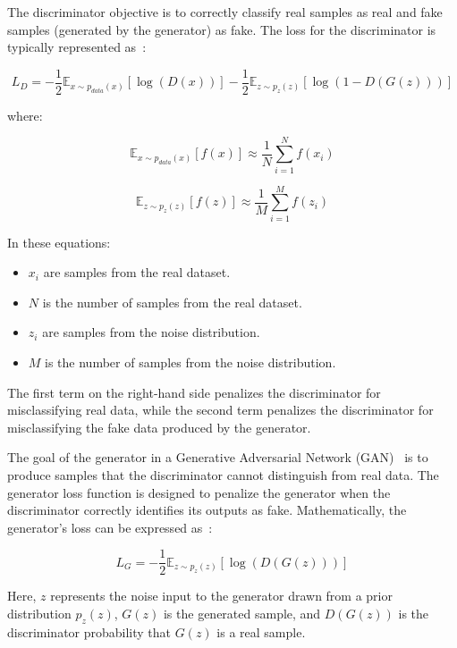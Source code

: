 \documentclass[12pt,a4paper]{report}
\begin{document}
The discriminator objective is to correctly classify real samples as real and fake samples (generated by the generator) as fake. The loss for the discriminator is typically represented as~\cite{gan}:

\begin{equation}
  L_D = - \frac{1}{2} \mathbb{E}_{x \sim p_{data}(x)} [\log(D(x))] - \frac{1}{2} \mathbb{E}_{z \sim p_z(z)} [\log(1 - D(G(z)))]
\end{equation}

where:

\begin{equation}
  \mathbb{E}_{x \sim p_{data}(x)} [f(x)] \approx \frac{1}{N} \sum_{i=1}^{N} f(x_i)
\end{equation}

\begin{equation}
  \mathbb{E}_{z \sim p_z(z)} [f(z)] \approx \frac{1}{M} \sum_{i=1}^{M} f(z_i)
\end{equation}

In these equations:
\begin{itemize}
  \item \( x_i \) are samples from the real dataset.
  \item \( N \) is the number of samples from the real dataset.
  \item \( z_i \) are samples from the noise distribution.
  \item \( M \) is the number of samples from the noise distribution.
\end{itemize}

The first term on the right-hand side penalizes the discriminator for misclassifying real data, while the second term penalizes the discriminator for misclassifying the fake data produced by the generator.

The goal of the generator in a Generative Adversarial Network (GAN)~\cite{goodfellow2014generative} is to produce samples that the discriminator cannot distinguish from real data. The generator loss function is designed to penalize the generator when the discriminator correctly identifies its outputs as fake. Mathematically, the generator's loss can be expressed as~\cite{gan}:

\begin{equation}
  L_G = -\frac{1}{2} \mathbb{E}_{z \sim p_z(z)} \left[ \log(D(G(z))) \right]
\end{equation}

Here, \( z \) represents the noise input to the generator drawn from a prior distribution \( p_z(z) \), \( G(z) \) is the generated sample, and \( D(G(z)) \) is the discriminator probability that \( G(z) \) is a real sample.
\end{document}
